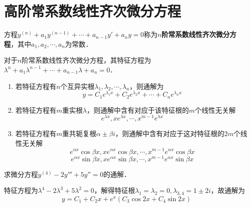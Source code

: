 \documentclass[12pt, a4paper, oneside, UTF8]{ctexbook}
\begin{document}
\section{高阶常系数线性齐次微分方程}
\begin{definition}
    方程$y^{(n)} + a_1 y^{(n-1)} + \cdots + a_{n-1} y' + a_n y = 0$称为\textbf{$n$阶常系数线性齐次微分方程}，其中$a_1, a_2, \cdots, a_n$为常数．
\end{definition}
\begin{theorem}
    对于$n$阶常系数线性齐次微分方程，其特征方程为$\lambda^n + a_{1} \lambda^{n-1} + \cdots + a_{n-1} \lambda + a_n = 0$．
    \begin{enumerate}
        \item 若特征方程有$n$个互异实根$\lambda_1, \lambda_2, \cdots, \lambda_n$，则通解为
        \[y = C_1 e^{\lambda_1 x} + C_2 e^{\lambda_2 x} + \cdots + C_n e^{\lambda_n x}\]
        \item 若特征方程有$m$重实根$\lambda$，则通解中含有对应于该特征根的$m$个线性无关解
        \[e^{\lambda x}, x e^{\lambda x}, \cdots, x^{m-1} e^{\lambda x}\]
        \item 若特征方程有$m$重共轭复根$\alpha \pm \beta i$，则通解中含有对应于这对特征根的$2m$个线性无关解
        \[e^{\alpha x} \cos \beta x, x e^{\alpha x} \cos \beta x, \cdots, x^{m-1} e^{\alpha x} \cos \beta x\]
        \[e^{\alpha x} \sin \beta x, x e^{\alpha x} \sin \beta x, \cdots, x^{m-1} e^{\alpha x} \sin \beta x\]
    \end{enumerate}
\end{theorem}
\begin{example}
    求微分方程$y^{(4)}-2y'''+5y''=0$的通解．
\end{example}
\begin{solution}
    特征方程为$\lambda^4 - 2\lambda^3 + 5\lambda^2 = 0$，解得特征根$\lambda_1=\lambda_2=0,\lambda_{3,4}=1\pm 2i$，故通解为
    \[\boxed{y=C_1 + C_2 x + e^{x}(C_3 \cos 2x + C_4 \sin 2x)}\]
\end{solution}
\end{document}
